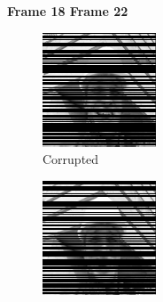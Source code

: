 \begin{figure}
  \centering
  \textbf{\hspace{0.2in} Frame 18 \hspace{1.5in} Frame 22\hspace{0.5in}\vspace{0.1in}}
  \begin{subfigure}{0.4\textwidth}
    \centering
    \includegraphics[width=.9\textwidth]{Chapter7/Images/foreman40_masked_18.png}
    \caption{Corrupted}
  \end{subfigure}
  \begin{subfigure}{0.4\textwidth}
    \centering
    \includegraphics[width=.9\textwidth]{Chapter7/Images/foreman40_masked_22.png}

\end{subfigure}
\end{figure}
